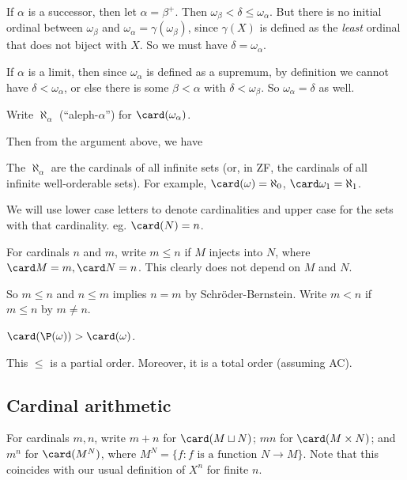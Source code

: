 \documentclass[a4paper]{article}
\begin{document}
If $\alpha$ is a successor, then let $\alpha = \beta^+$. Then $\omega_\beta < \delta \leq \omega_\alpha$. But there is no initial ordinal between $\omega_\beta$ and $\omega_\alpha = \gamma(\omega_\beta)$, since $\gamma(X)$ is defined as the \emph{least} ordinal that does not biject with $X$. So we must have $\delta = \omega_\alpha$.

If $\alpha$ is a limit, then since $\omega_\alpha$ is defined as a supremum, by definition we cannot have $\delta < \omega_\alpha$, or else there is some $\beta < \alpha$ with $\delta < \omega_\beta$. So $\omega_\alpha = \delta$ as well.

\begin{defi}
  Write $\aleph_\alpha$ (``aleph-$\alpha$'') for $\card(\omega_\alpha)$.
\end{defi}

Then from the argument above, we have
\begin{thm}[]
  The $\aleph_\alpha$ are the cardinals of all infinite sets (or, in ZF, the cardinals of all infinite well-orderable sets). For example, $\card(\omega) = \aleph_0$, $\card \omega_1 = \aleph_1$.
\end{thm}

We will use lower case letters to denote cardinalities and upper case for the sets with that cardinality. eg. $\card(N) = n$.

\begin{defi}
  For cardinals $n$ and $m$, write $m \leq n$ if $M$ injects into $N$, where $\card M = m, \card N = n$. This clearly does not depend on $M$ and $N$.

  So $m \leq n$ and $n\leq m$ implies $n = m$ by Schr\"oder-Bernstein. Write $m < n$ if $m \leq n$ by $m\not = n$.
\end{defi}

\begin{eg}
  $\card(\P(\omega)) > \card(\omega)$.
\end{eg}

This $\leq$ is a partial order. Moreover, it is a total order (assuming AC).

\subsection{Cardinal arithmetic}
\begin{defi}
  For cardinals $m, n$, write $m + n$ for $\card(M\sqcup N)$; $mn$ for $\card(M\times N)$; and $m^n$ for $\card(M^N)$, where $M^N = \{f: f\text{ is a function }N\to M\}$. Note that this coincides with our usual definition of $X^n$ for finite $n$.
\end{defi}
\end{document}
